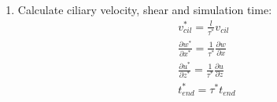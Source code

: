 \documentclass[10pt,a4paper]{article}
\def\non{\nonumber}
\def\p{\partial}
\def\l{\mathit{l}}
\begin{document}
\begin{enumerate}
\item Calculate ciliary velocity, shear and simulation time:
\begin{eqnarray}\label{nd2dpars4a}
	v^*_{cil} = \frac{\l}{\tau^*}  v_{cil} \non \\
	\frac{\p w^*}{\p x^*} = \frac{1}{\tau^*} \frac{\p w}{\p x} \non \\
	\frac{\p u^*}{\p z^*} = \frac{1}{\tau^*} \frac{\p u}{\p z} \non \\
	t^*_{end} = \tau^* t_{end}
\end{eqnarray}
	
\end{enumerate}
\end{document}
